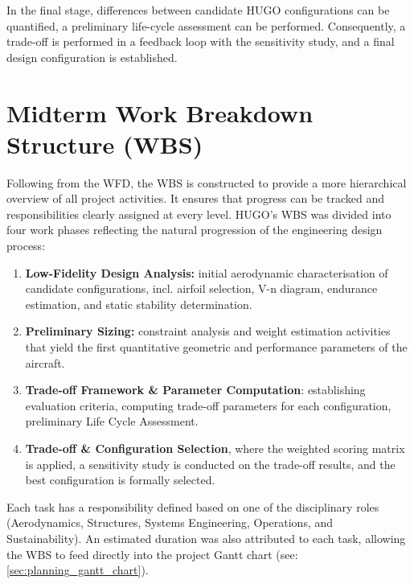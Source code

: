 In the final stage, differences between candidate HUGO configurations can be quantified, a preliminary life-cycle assessment can be performed. Consequently, a trade-off is performed in a feedback loop with the sensitivity study, and a final design configuration is established. %


\section{Midterm Work Breakdown Structure (WBS)}
\label{sec:planning_WBS}

Following from the WFD, the WBS is constructed to provide a more hierarchical overview of all project activities. %
It ensures that progress can be tracked and responsibilities clearly assigned at every level. HUGO's WBS was divided into four work phases reflecting the natural progression of the engineering design process:

\begin{enumerate}
    \item \textbf{Low-Fidelity Design Analysis:} initial aerodynamic characterisation of candidate configurations, incl. airfoil selection, V-n diagram, endurance estimation, and static stability determination.
    
    \item \textbf{Preliminary Sizing:} constraint analysis and weight estimation activities that yield the first quantitative geometric and performance parameters of the aircraft.

    \item \textbf{Trade-off Framework \& Parameter Computation}: establishing evaluation criteria, computing trade-off parameters for each configuration, preliminary Life Cycle Assessment.

    \item \textbf{Trade-off \& Configuration Selection}, where the weighted scoring matrix is applied, a sensitivity study is conducted on the trade-off results, and the best configuration is formally selected.
\end{enumerate}

Each task has a responsibility defined based on one of the disciplinary roles (Aerodynamics, Structures, Systems Engineering, Operations, and Sustainability). An estimated duration was also attributed to each task, allowing the WBS to feed directly into the project Gantt chart (see: \autoref{sec:planning_gantt_chart}).

